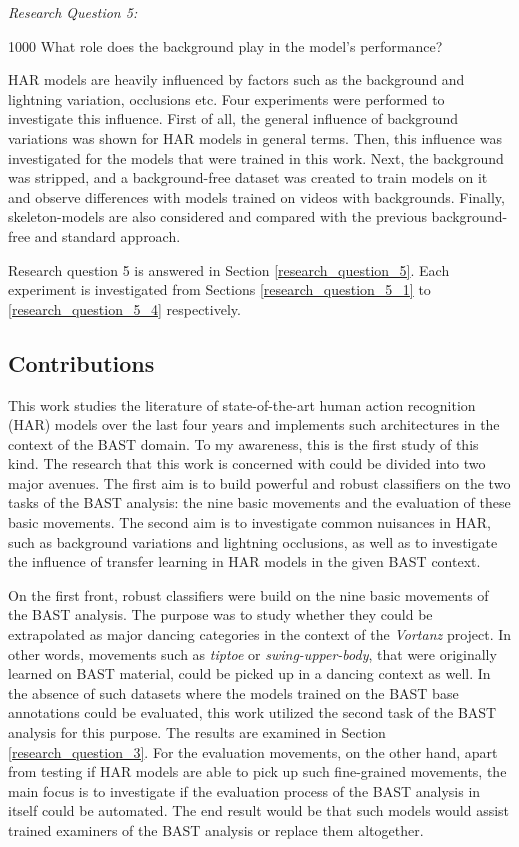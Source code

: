 \documentclass[extern,palatino]{cgMA}
\begin{document}
\bigskip \bigskip
\emph{Research Question 5:}
\bigskip
\begin{adjustwidth}{100}{0}
What role does the background play in the model's performance? 
\bigskip

\noindent HAR models are heavily influenced by factors such as the background and lightning variation, occlusions etc. Four experiments were performed to investigate this influence. First of all, the general influence of background variations was shown for HAR models in general terms. Then, this influence was investigated for the models that were trained in this work. Next, the background was stripped, and a background-free dataset was created to train models on it and observe differences with models trained on videos with backgrounds. Finally, skeleton-models are also considered and compared with the previous background-free and standard approach.

\noindent Research question 5 is answered in Section \ref{research_question_5}. Each experiment is investigated from Sections \ref{research_question_5_1} to \ref{research_question_5_4} respectively.
\end{adjustwidth}
\bigskip \bigskip
 
\subsection{Contributions}
\label{contributions}

This work studies the literature of state-of-the-art human action recognition (HAR) models over the last four years and implements such architectures in the context of the BAST domain. To my awareness, this is the first study of this kind. The research that this work is concerned with could be divided into two major avenues. The first aim is to build powerful and robust classifiers on the two tasks of the BAST analysis: the nine basic movements and the evaluation of these basic movements. The second aim is to investigate common nuisances in HAR, such as background variations and lightning occlusions, as well as to investigate the influence of transfer learning in HAR models in the given BAST context.

\bigskip
\noindent On the first front, robust classifiers were build on the nine basic movements of the BAST analysis. The purpose was to study whether they could be extrapolated as major dancing categories in the context of the \textit{Vortanz} project. In other words, movements such as \textit{tiptoe} or \textit{swing-upper-body}, that were originally learned on BAST material, could be picked up in a dancing context as well. In the absence of such datasets where the models trained on the BAST base annotations could be evaluated, this work utilized the second task of the BAST analysis for this purpose. The results are examined in Section \ref{research_question_3}. For the evaluation movements, on the other hand, apart from testing if HAR models are able to pick up such fine-grained movements, the main focus is to investigate if the evaluation process of the BAST analysis in itself could be automated. The end result would be that such models would assist trained examiners of the BAST analysis or replace them altogether.
\end{document}
